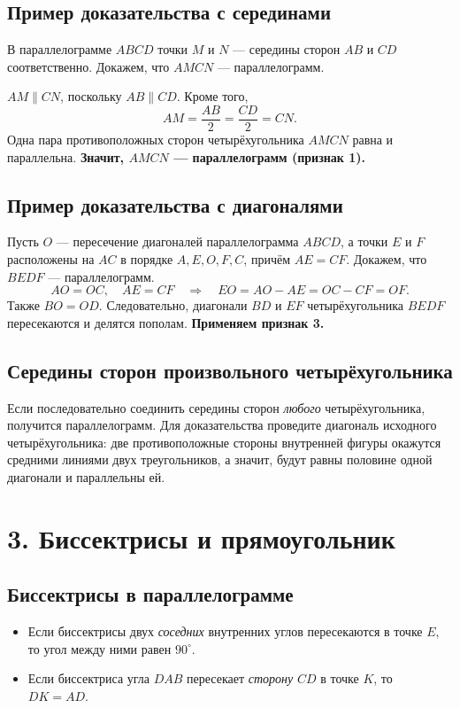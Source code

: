 \documentclass[a4paper,12pt]{article}
\newcommand{\key}[1]{\textbf{\color{darkaccent}#1}}
\newcommand{\checkitem}[1]{\item[\(\square\)] #1}
\newenvironment{skills}{\begin{itemize}[label=\(\square\),leftmargin=*,itemsep=2pt]}{\end{itemize}}
\begin{document}
\subsection*{Пример доказательства с серединами}
В параллелограмме \(ABCD\) точки \(M\) и \(N\) --- середины сторон \(AB\) и \(CD\) соответственно. Докажем, что \(AMCN\) --- параллелограмм.

\(AM\parallel CN\), поскольку \(AB\parallel CD\). Кроме того,
\[
 AM=\frac{AB}{2}=\frac{CD}{2}=CN.
\]
Одна пара противоположных сторон четырёхугольника \(AMCN\) равна и параллельна. \key{Значит, \(AMCN\) --- параллелограмм (признак 1).}

\subsection*{Пример доказательства с диагоналями}
Пусть \(O\) --- пересечение диагоналей параллелограмма \(ABCD\), а точки \(E\) и \(F\) расположены на \(AC\) в порядке \(A,E,O,F,C\), причём \(AE=CF\). Докажем, что \(BEDF\) --- параллелограмм.
\[
 AO=OC,\quad AE=CF \quad\Longrightarrow\quad
 EO=AO-AE=OC-CF=OF.
\]
Также \(BO=OD\). Следовательно, диагонали \(BD\) и \(EF\) четырёхугольника \(BEDF\) пересекаются и делятся пополам. \key{Применяем признак 3.}

\subsection*{Середины сторон произвольного четырёхугольника}
Если последовательно соединить середины сторон \emph{любого} четырёхугольника, получится параллелограмм. Для доказательства проведите диагональ исходного четырёхугольника: две противоположные стороны внутренней фигуры окажутся средними линиями двух треугольников, а значит, будут равны половине одной диагонали и параллельны ей.

\clearpage
\section*{3. Биссектрисы и прямоугольник}
\subsection*{Биссектрисы в параллелограмме}
\begin{skills}
\checkitem{Если биссектрисы двух \emph{соседних} внутренних углов пересекаются в точке \(E\), то угол между ними равен \(90^\circ\).}
\checkitem{Если биссектриса угла \(DAB\) пересекает \emph{сторону} \(CD\) в точке \(K\), то \(DK=AD\).}
\end{skills}
\end{document}
